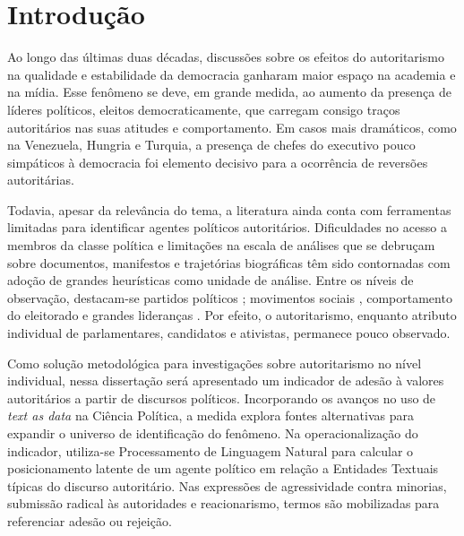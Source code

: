 \documentclass[
12pt,				%
openright,			%
twoside,			%
a4paper,			%
english,			%
french,				%
spanish,			%
brazil				%
]{abntex2}
\begin{document}
\chapter{Introdução}

Ao longo das últimas duas décadas, discussões sobre os efeitos do autoritarismo na qualidade e estabilidade da democracia ganharam maior espaço na academia e na mídia. Esse fenômeno se deve, em grande medida, ao aumento da presença de líderes políticos, eleitos democraticamente, que carregam consigo traços autoritários nas suas atitudes e comportamento. Em casos mais dramáticos, como na Venezuela, Hungria e Turquia, a presença de chefes do executivo pouco simpáticos à democracia foi elemento decisivo para a ocorrência de reversões autoritárias.

Todavia, apesar da relevância do tema, a literatura ainda conta com ferramentas limitadas para identificar agentes políticos autoritários. Dificuldades no acesso a membros da classe política e limitações na escala de análises que se debruçam sobre documentos, manifestos e trajetórias biográficas têm sido contornadas com adoção de grandes heurísticas como unidade de análise. Entre os níveis de observação, destacam-se partidos políticos \cite{mudde2009populist, loxton2014authoritarian, mudde2016introduction}; movimentos sociais \cite{caiani2017radical}, comportamento do eleitorado \cite{booth1984political, seligson2003democracies, seligson2005feeding, rydgren2007sociology} e grandes lideranças \cite{levitsky2018democracies, norris2019cultural}. Por efeito, o autoritarismo, enquanto atributo individual de parlamentares, candidatos e ativistas, permanece pouco observado. 

Como solução metodológica para investigações sobre autoritarismo no nível individual, nessa dissertação será apresentado um indicador de adesão à valores autoritários a partir de discursos políticos. Incorporando os avanços no uso de \emph{text as data} na Ciência Política, a medida explora fontes alternativas para expandir o universo de identificação do fenômeno. Na operacionalização do indicador, utiliza-se Processamento de Linguagem Natural para calcular o posicionamento latente de um agente político em relação a Entidades Textuais típicas do discurso autoritário. Nas expressões de agressividade contra minorias, submissão radical às autoridades e reacionarismo, termos são mobilizadas para referenciar adesão ou rejeição.
\end{document}
